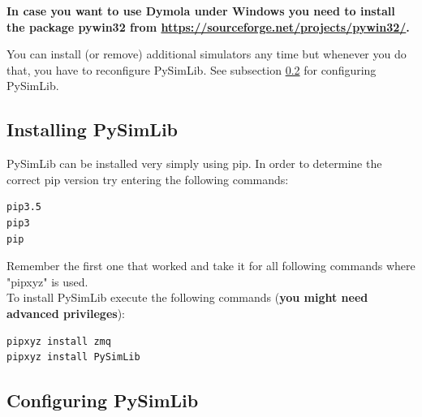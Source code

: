 \textbf{In case you want to use Dymola under Windows you need to install the package \grqq{}pywin32\grqq{} from \url{https://sourceforge.net/projects/pywin32/}.}

You can install (or remove) additional simulators any time but whenever you do that, you have to reconfigure PySimLib.
See subsection \ref{configuringPySimLib} for configuring PySimLib.





\subsection{Installing PySimLib}

PySimLib can be installed very simply using pip.
In order to determine the correct pip version try entering the following commands:
\lstset{language=bash}
\begin{lstlisting}
pip3.5
pip3
pip
\end{lstlisting}

Remember the first one that worked and take it for all following commands where "pipxyz" is used.
\\
To install PySimLib execute the following commands (\textbf{you might need advanced privileges}):
\begin{lstlisting}
pipxyz install zmq
pipxyz install PySimLib
\end{lstlisting}






\subsection{Configuring PySimLib}
\label{configuringPySimLib}

